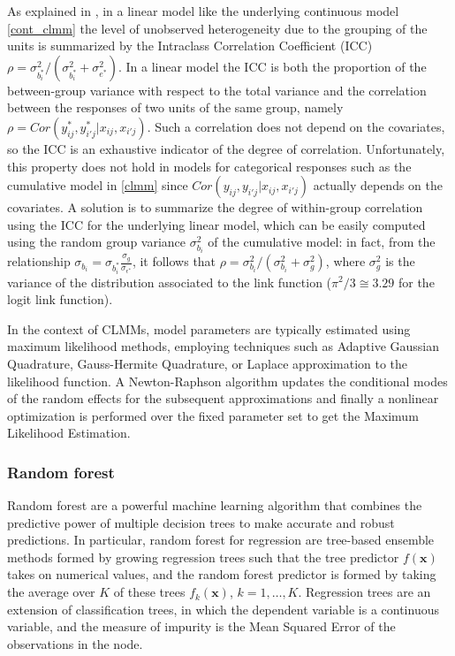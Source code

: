 As explained in \cite{grilli2011multilevel}, in a linear model like the underlying continuous model \eqref{cont_clmm} the level of unobserved heterogeneity due
to the grouping of the units is summarized by the Intraclass Correlation Coefficient (ICC)
\(\rho=\sigma^2_{b_i^*}/(\sigma^2_{b_i^*}+\sigma^2_{e^*})\). In a linear model the ICC is both the proportion of the
between-group variance with respect to the total variance and the correlation between
the responses of two units of the same group, namely \(\rho = Cor(y_{ij}^*,y_{i'j}^*|x_{ij},x_{i'j})\).
Such a correlation does not depend on the covariates, so the ICC is an
exhaustive indicator of the degree of correlation. Unfortunately, this property does not hold
in models for categorical responses such as the cumulative model in \eqref{clmm}
since \(Cor(y_{ij},y_{i'j}|x_{ij},x_{i'j})\) actually depends on the covariates. A solution is to
summarize the degree of within-group correlation using the ICC for the underlying linear
model, which can be easily computed using the random group variance \(\sigma^2_{b_i}\) of the cumulative model:
in fact, from the relationship \(\sigma_{b_i} = \sigma_{b_i^*} \frac{\sigma_{g}}{\sigma_{\epsilon^*}}\), it follows that \(\rho=\sigma^2_{b_i}/(\sigma^2_{b_i}+\sigma^2_{g})\), where \(\sigma^2_{g}\)
is the variance of the distribution associated to the link function (\(\pi^2 / 3 \cong 3.29\) for the logit link function).

In the context of CLMMs, model parameters are typically estimated using maximum likelihood methods, employing techniques such as Adaptive Gaussian Quadrature, Gauss-Hermite Quadrature, or Laplace approximation to the likelihood function.
A Newton-Raphson algorithm updates the conditional modes of the random effects for the subsequent approximations and finally a nonlinear optimization is performed over the fixed parameter set to get the Maximum Likelihood Estimation.

\subsubsection{Random forest}
\label{sec:rf}
Random forest are a powerful machine learning algorithm that combines the predictive power of multiple decision trees to make accurate and robust predictions.
In particular, random forest for regression \cite{breiman2001random,james2013introduction} are tree-based ensemble methods formed by growing regression trees such that the tree predictor \(f(\bm{x})\) takes on numerical values, and the random forest predictor is formed by taking the average over \(K\) of these trees \(f_k(\bm{x})\), \(k=1,\dots,K\).
Regression trees are an extension of classification trees, in which the dependent variable is a continuous variable, and the measure of impurity is the Mean Squared Error of the observations in the node.


